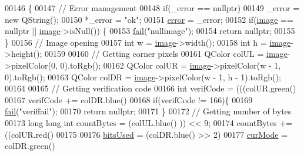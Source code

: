 \begin{DoxyCode}
00146 \{
00147     \textcolor{comment}{// Error management}
00148     \textcolor{keywordflow}{if}(\_error == \textcolor{keyword}{nullptr})
00149         \_error = \textcolor{keyword}{new} QString();
00150     *\_error = \textcolor{stringliteral}{"ok"};
00151     \mbox{\hyperlink{class_model_p_c_a4e5a9c0ca1f06fe5bc478b6bf248c37c}{error}} = \_error;
00152     \textcolor{keywordflow}{if}(\mbox{\hyperlink{namespacetests-setup_ad55b685280f549e15688a94cbb89f512}{image}} == \textcolor{keyword}{nullptr} || \mbox{\hyperlink{namespacetests-setup_ad55b685280f549e15688a94cbb89f512}{image}}->isNull()) \{
00153         \mbox{\hyperlink{class_model_p_c_a47464b59b7e37fcee25e55475708aabd}{fail}}(\textcolor{stringliteral}{"nullimage"});
00154         \textcolor{keywordflow}{return} \textcolor{keyword}{nullptr};
00155     \}
00156     \textcolor{comment}{// Image opening}
00157     \textcolor{keywordtype}{int} w = \mbox{\hyperlink{namespacetests-setup_ad55b685280f549e15688a94cbb89f512}{image}}->width();
00158     \textcolor{keywordtype}{int} h = \mbox{\hyperlink{namespacetests-setup_ad55b685280f549e15688a94cbb89f512}{image}}->height();
00159 
00160     \textcolor{comment}{// Getting corner pixels}
00161     QColor colUL = \mbox{\hyperlink{namespacetests-setup_ad55b685280f549e15688a94cbb89f512}{image}}->pixelColor(0, 0).toRgb();
00162     QColor colUR = \mbox{\hyperlink{namespacetests-setup_ad55b685280f549e15688a94cbb89f512}{image}}->pixelColor(w - 1, 0).toRgb();
00163     QColor colDR = \mbox{\hyperlink{namespacetests-setup_ad55b685280f549e15688a94cbb89f512}{image}}->pixelColor(w - 1, h - 1).toRgb();
00164 
00165     \textcolor{comment}{// Getting verification code}
00166     \textcolor{keywordtype}{int} verifCode = (((colUR.green() %
00167     verifCode += colDR.blue() %
00168     \textcolor{keywordflow}{if}(verifCode != 166)\{
00169         \mbox{\hyperlink{class_model_p_c_a47464b59b7e37fcee25e55475708aabd}{fail}}(\textcolor{stringliteral}{"veriffail"});
00170         \textcolor{keywordflow}{return} \textcolor{keyword}{nullptr};
00171     \}
00172     \textcolor{comment}{// Getting number of bytes}
00173     \textcolor{keywordtype}{long} \textcolor{keywordtype}{long} \textcolor{keywordtype}{int} countBytes = (colUL.blue() %
      )) << 9;
00174     countBytes += ((colUR.red() %
00175 
00176     \mbox{\hyperlink{class_model_p_c_a655deb6a8afa94c7f4aadb3056989038}{bitsUsed}} = (colDR.blue() >> 2) %
00177     \mbox{\hyperlink{class_model_p_c_ad74974ac236182c1d6d2cf0729fac3dd}{curMode}} = colDR.green() %

\end{DoxyCode}
